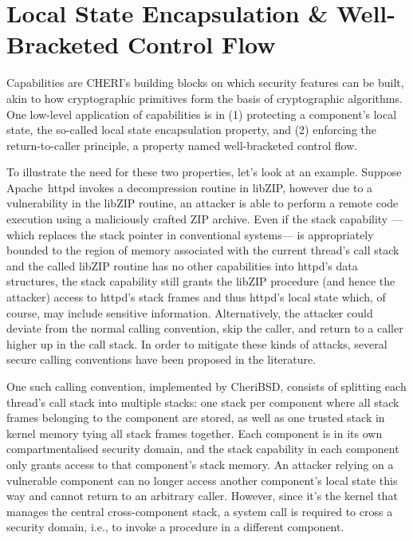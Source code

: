\documentclass[main.tex]{subfiles}
\begin{document}
\section{Local State Encapsulation \& Well-Bracketed Control Flow}
Capabilities are CHERI’s building blocks on which security features can be built, akin to how cryptographic primitives form the basis of cryptographic algorithms. One low-level application of capabilities is in (1) protecting a component's local state, the so-called local state encapsulation property, and (2) enforcing the return-to-caller principle, a property named well-bracketed control flow.

To illustrate the need for these two properties, let’s look at an example. Suppose Apache httpd invokes a decompression routine in libZIP, however due to a vulnerability in the libZIP routine, an attacker is able to perform a remote code execution using a maliciously crafted ZIP archive. Even if the stack capability —which replaces the stack pointer in conventional systems— is appropriately bounded to the region of memory associated with the current thread’s call stack and the called libZIP routine has no other capabilities into httpd’s data structures, the stack capability still grants the libZIP procedure (and hence the attacker) access to httpd’s stack frames and thus httpd’s local state which, of course, may include sensitive information. Alternatively, the attacker could deviate from the normal calling convention, skip the caller, and return to a caller higher up in the call stack. In order to mitigate these kinds of attacks, several secure calling conventions have been proposed in the literature.

One such calling convention, implemented by CheriBSD, consists of splitting each thread’s call stack into multiple stacks: one stack per component where all stack frames belonging to the component are stored, as well as one trusted stack in kernel memory tying all stack frames together. Each component is in its own compartmentalised security domain, and the stack capability in each component only grants access to that component’s stack memory. An attacker relying on a vulnerable component can no longer access another component’s local state this way and cannot return to an arbitrary caller. However, since it’s the kernel that manages the central cross-component stack, a system call is required to cross a security domain, i.e., to invoke a procedure in a different component.
\end{document}
